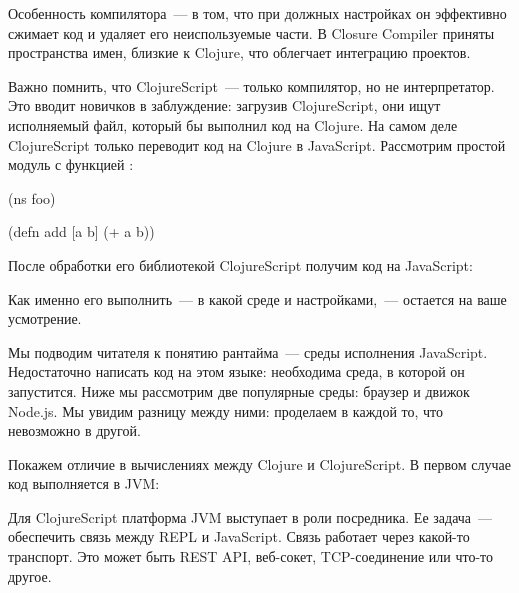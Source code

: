 
Особенность компилятора~--- в том, что при должных настройках он эффективно сжимает код и удаляет его неиспользуемые части. В Closure Compiler приняты пространства имен, близкие к Clojure, что облегчает интеграцию проектов.

Важно помнить, что ClojureScript~--- только компилятор, но не интерпретатор. Это вводит новичков в заблуждение: загрузив ClojureScript, они ищут исполняемый файл, который бы выполнил код на Clojure. На самом деле ClojureScript только переводит код на Clojure в JavaScript. Рассмотрим простой модуль  с функцией :

\begin{english}
  \begin{clojure}
(ns foo)

(defn add [a b]
  (+ a b))
  \end{clojure}
\end{english}

После обработки его библиотекой ClojureScript получим код на JavaScript:

\begin{english}
\end{english}

Как именно его выполнить~--- в какой среде и настройками,~--- остается на ваше усмотрение.

Мы подводим читателя к понятию рантайма~--- среды исполнения JavaScript. Недостаточно написать код на этом языке: необходима среда, в которой он запустится. Ниже мы рассмотрим две популярные среды: браузер и движок Node.js. Мы увидим разницу между ними: проделаем в каждой то, что невозможно в другой.


Покажем отличие в вычислениях между Clojure и ClojureScript. В первом случае код выполняется в JVM:

\begin{figure}[H]
  \centering
  
  \label{fig:chart-repl-03}
\end{figure}

Для ClojureScript платформа JVM выступает в роли посредника. Ее задача~--- обеспечить связь между REPL и JavaScript. Связь работает через какой-то транспорт. Это может быть REST API, веб-сокет, TCP-соединение или что-то другое.

